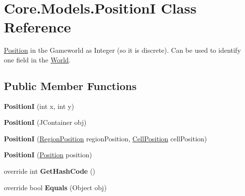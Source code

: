 \hypertarget{classCore_1_1Models_1_1PositionI}{\section{Core.\-Models.\-Position\-I Class Reference}
\label{classCore_1_1Models_1_1PositionI}
}


\hyperlink{classCore_1_1Models_1_1Position}{Position} in the Gameworld as Integer (so it is discrete). Can be used to identify one field in the \hyperlink{classCore_1_1Models_1_1World}{World}.  


\subsection*{Public Member Functions}
\begin{DoxyCompactItemize}
\item 
\hypertarget{classCore_1_1Models_1_1PositionI_a77a350d1cd0431b7640fc50c2d1f1b08}{{\bfseries Position\-I} (int x, int y)}\label{classCore_1_1Models_1_1PositionI_a77a350d1cd0431b7640fc50c2d1f1b08}

\item 
\hypertarget{classCore_1_1Models_1_1PositionI_aa96d094d9d0c73b95ed5e3bcc3c7139c}{{\bfseries Position\-I} (J\-Container obj)}\label{classCore_1_1Models_1_1PositionI_aa96d094d9d0c73b95ed5e3bcc3c7139c}

\item 
\hypertarget{classCore_1_1Models_1_1PositionI_a754155c0d79a76caa5175332f7cb87f4}{{\bfseries Position\-I} (\hyperlink{classCore_1_1Models_1_1RegionPosition}{Region\-Position} region\-Position, \hyperlink{classCore_1_1Models_1_1CellPosition}{Cell\-Position} cell\-Position)}\label{classCore_1_1Models_1_1PositionI_a754155c0d79a76caa5175332f7cb87f4}

\item 
\hypertarget{classCore_1_1Models_1_1PositionI_a7ae2d0db70f2e9273cfa3a5c9ff24bc7}{{\bfseries Position\-I} (\hyperlink{classCore_1_1Models_1_1Position}{Position} position)}\label{classCore_1_1Models_1_1PositionI_a7ae2d0db70f2e9273cfa3a5c9ff24bc7}

\item 
\hypertarget{classCore_1_1Models_1_1PositionI_a082277a73568d67195014709867621c4}{override int {\bfseries Get\-Hash\-Code} ()}\label{classCore_1_1Models_1_1PositionI_a082277a73568d67195014709867621c4}

\item 
\hypertarget{classCore_1_1Models_1_1PositionI_a2ffe63b0f20ec61abc364574f495f7c5}{override bool {\bfseries Equals} (Object obj)}\label{classCore_1_1Models_1_1PositionI_a2ffe63b0f20ec61abc364574f495f7c5}


\end{DoxyCompactItemize}
